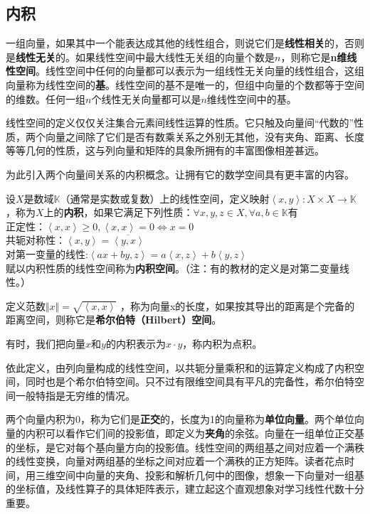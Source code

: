\subsection{内积}
一组向量，如果其中一个能表达成其他的线性组合，则说它们是\textbf{线性相关}的，否则是\textbf{线性无关}的。如果线性空间中最大线性无关组的向量个数是$ n $，则称它是\textbf{n维线性空间}。线性空间中任何的向量都可以表示为一组线性无关向量的线性组合，这组向量称为线性空间的\textbf{基}。线性空间的基不是唯一的，但组中向量的个数都等于空间的维数。任何一组$ n $个线性无关向量都可以是$ n $维线性空间中的基。

线性空间的定义仅仅关注集合元素间线性运算的性质。它只触及向量间“代数的”性质，两个向量之间除了它们是否有数乘关系之外别无其他，没有夹角、距离、长度等等几何的性质，这与列向量和矩阵的具象所拥有的丰富图像相差甚远。

为此引入两个向量间关系的内积概念。让拥有它的数学空间具有更丰富的内容。

\kaishu

设$ X $是数域$ \mathbb{K} $（通常是实数或复数）上的线性空间，定义映射$ \left\langle x,y \right \rangle :X\times X\rightarrow \mathbb{K} $，称为$ X $上的\textbf{内积}，如果它满足下列性质：$ \forall x,y,z \in X, \forall a,b \in \mathbb{K} $有\\
正定性：$ \left\langle x,x\right \rangle \ge 0, \left \langle x,x \right \rangle = 0\Leftrightarrow x=0 $\\
共轭对称性：$ \left\langle x,y \right \rangle = \overline{\left \langle y,x \right \rangle} $\\
对第一变量的线性:$ \left\langle ax+by,z \right \rangle = a\left \langle x,z \right \rangle + b \left\langle y,z \right \rangle $\\
赋以内积性质的线性空间称为\textbf{内积空间}。（注：有的教材的定义是对第二变量线性。）

定义范数$ \Vert x \Vert = \sqrt{\left \langle x,x \right\rangle} $
，称为向量x的长度，如果按其导出的距离是个完备的距离空间，则称它是\textbf{希尔伯特（Hilbert）空间}。

\songti

有时，我们把向量$ x $和$ y $的内积表示为$ x \cdot y $，称内积为点积。

依此定义，由列向量构成的线性空间，以共轭分量乘积和的运算定义构成了内积空间，同时也是个希尔伯特空间。只不过有限维空间具有平凡的完备性，希尔伯特空间一般特指是无穷维的情况。

两个向量内积为0，称为它们是\textbf{正交}的，长度为1的向量称为\textbf{单位向量}。两个单位向量的内积可以看作它们间的投影值，即定义为\textbf{夹角}的余弦。向量在一组单位正交基的坐标，是它对每个基向量方向的投影值。线性空间的两组基之间对应着一个满秩的线性变换，向量对两组基的坐标之间对应着一个满秩的正方矩阵。读者花点时间，用三维空间中向量的夹角、投影和解析几何中的图像，想象一下向量对一组基的坐标值，及线性算子的具体矩阵表示，建立起这个直观想象对学习线性代数十分重要。


